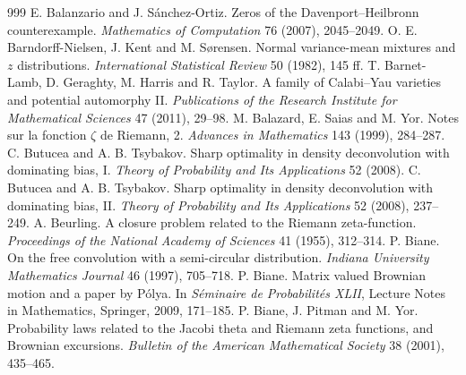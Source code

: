 \begin{thebibliography}{999}
 E. Balanzario and J. S\'anchez-Ortiz. Zeros of the Davenport--Heilbronn counterexample. \emph{Mathematics of Computation} 76 (2007), 2045--2049.
 O. E. Barndorff-Nielsen, J. Kent and M. S{\o}rensen. Normal variance-mean mixtures and $z$ distributions. \emph{International Statistical Review} 50 (1982), 145 ff.
 T. Barnet-Lamb, D. Geraghty, M. Harris and R. Taylor. A family of Calabi--Yau varieties and potential automorphy II. \emph{Publications of the Research Institute for Mathematical Sciences} 47 (2011), 29--98.
 M. Balazard, E. Saias and M. Yor. Notes sur la fonction $\zeta$ de Riemann, 2. \emph{Advances in Mathematics} 143 (1999), 284--287.
 C. Butucea and A. B. Tsybakov. Sharp optimality in density deconvolution with dominating bias, I. \emph{Theory of Probability and Its Applications} 52 (2008).
 C. Butucea and A. B. Tsybakov. Sharp optimality in density deconvolution with dominating bias, II. \emph{Theory of Probability and Its Applications} 52 (2008), 237--249.
 A. Beurling. A closure problem related to the Riemann zeta-function. \emph{Proceedings of the National Academy of Sciences} 41 (1955), 312--314.
 P. Biane. On the free convolution with a semi-circular distribution. \emph{Indiana University Mathematics Journal} 46 (1997), 705--718.
 P. Biane. Matrix valued Brownian motion and a paper by P\'olya. In \emph{S\'eminaire de Probabilit\'es XLII}, Lecture Notes in Mathematics, Springer, 2009, 171--185.
 P. Biane, J. Pitman and M. Yor. Probability laws related to the Jacobi theta and Riemann zeta functions, and Brownian excursions. \emph{Bulletin of the American Mathematical Society} 38 (2001), 435--465.

\end{thebibliography}
